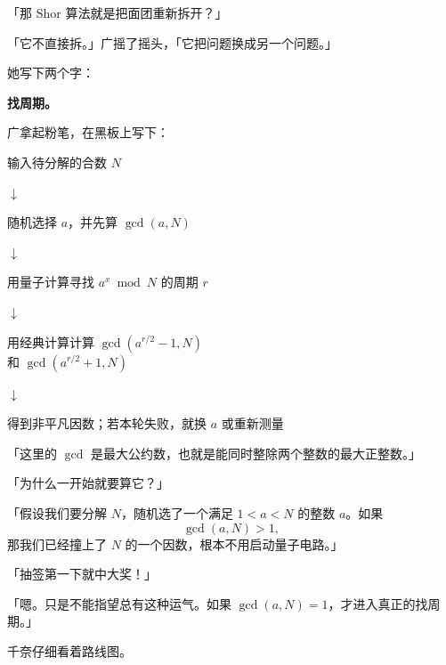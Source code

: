 「那 Shor 算法就是把面团重新拆开？」

「它不直接拆。」广摇了摇头，「它把问题换成另一个问题。」

她写下两个字：

\begin{center}
\textbf{找周期。}
\end{center}

广拿起粉笔，在黑板上写下：

\begin{center}
\setlength{\fboxsep}{8pt}%
\colorbox{codebg}{%
\begin{minipage}{0.88\linewidth}
输入待分解的合数 $N$

\begin{center}$\downarrow$\end{center}

随机选择 $a$，并先算 $\gcd(a,N)$

\begin{center}$\downarrow$\end{center}

用量子计算寻找 $a^x \bmod N$ 的周期 $r$

\begin{center}$\downarrow$\end{center}

用经典计算计算 $\gcd(a^{r/2}-1,N)$\\
\hspace*{6.5em}和 $\gcd(a^{r/2}+1,N)$

\begin{center}$\downarrow$\end{center}

得到非平凡因数；若本轮失败，就换 $a$ 或重新测量
\end{minipage}}
\end{center}

「这里的 $\gcd$ 是最大公约数，也就是能同时整除两个整数的最大正整数。」

「为什么一开始就要算它？」

「假设我们要分解 $N$，随机选了一个满足 $1<a<N$ 的整数 $a$。如果
\begin{equation}
\gcd(a,N)>1,
\end{equation}
那我们已经撞上了 $N$ 的一个因数，根本不用启动量子电路。」

「抽签第一下就中大奖！」

「嗯。只是不能指望总有这种运气。如果 $\gcd(a,N)=1$，才进入真正的找周期。」

千奈仔细看着路线图。

